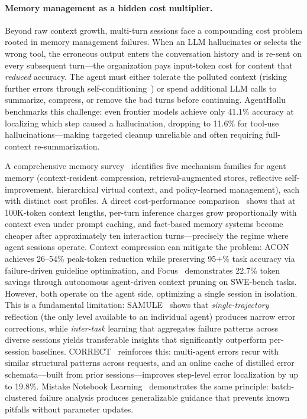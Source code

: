 \paragraph{Memory management as a hidden cost multiplier.}
Beyond raw context growth, multi-turn sessions face a compounding
cost problem rooted in memory management failures.  When an LLM
hallucinates or selects the wrong tool, the erroneous output enters
the conversation history and is re-sent on every subsequent
turn---the organization pays input-token cost for content that
\emph{reduced} accuracy.  The agent must either tolerate the
polluted context (risking further errors through
self-conditioning~\cite{driftbench2026}) or spend additional LLM
calls to summarize, compress, or remove the bad turns before
continuing.  AgentHallu~\cite{agenthallu2026} benchmarks this
challenge: even frontier models achieve only 41.1\% accuracy at
localizing which step caused a hallucination, dropping to 11.6\%
for tool-use hallucinations---making targeted cleanup unreliable and
often requiring full-context re-summarization.

A comprehensive memory
survey~\cite{memorysurv2026} identifies five mechanism families for
agent memory (context-resident compression, retrieval-augmented
stores, reflective self-improvement, hierarchical virtual context,
and policy-learned management), each with distinct cost profiles.
A direct cost-performance comparison~\cite{memcost2026} shows that
at 100K-token context lengths, per-turn inference charges grow
proportionally with context even under prompt caching, and
fact-based memory systems become cheaper after approximately ten
interaction turns---precisely the regime where agent sessions
operate.  Context compression can mitigate the
problem: ACON~\cite{acon2025} achieves 26--54\% peak-token reduction
while preserving 95+\% task accuracy via failure-driven guideline
optimization, and Focus~\cite{focus2026} demonstrates 22.7\% token
savings through autonomous agent-driven context pruning on SWE-bench
tasks.  However, both operate on the agent side, optimizing a
single session in isolation.  This is a fundamental limitation:
SAMULE~\cite{samule2025} shows that \emph{single-trajectory}
reflection (the only level available to an individual agent)
produces narrow error corrections, while \emph{inter-task} learning
that aggregates failure patterns across diverse sessions yields
transferable insights that significantly outperform per-session
baselines.  CORRECT~\cite{correct2025} reinforces this: multi-agent
errors recur with similar structural patterns across requests, and
an online cache of distilled error schemata---built from prior
sessions---improves step-level error localization by up to 19.8\%.
Mistake Notebook Learning~\cite{mnl2025} demonstrates the same
principle: batch-clustered failure analysis produces generalizable
guidance that prevents known pitfalls without parameter updates.


